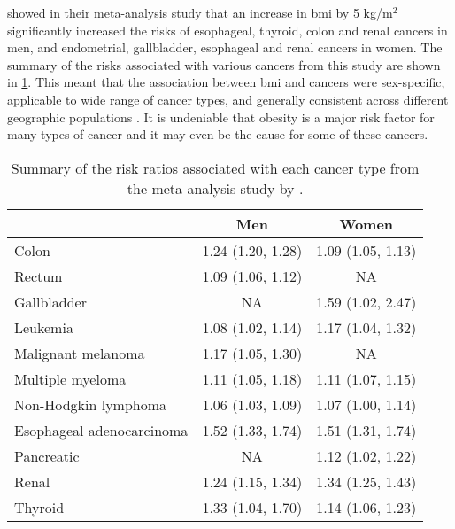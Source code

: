 \citet{Renehan2008} showed in their meta-analysis study  that an increase in \gls{bmi} by 5 kg/m$^2$ significantly increased the risks of esophageal, thyroid, colon and renal cancers in men, and endometrial, gallbladder, esophageal and renal cancers in women.
The summary of the risks associated with various cancers from this study are shown in \cref{tab:renehan_cancer_risks}.
This meant that the association between \gls{bmi} and cancers were sex-specific, applicable to wide range of cancer types, and generally consistent across different geographic populations \citep{Renehan2008,Roberts2010}.
It is undeniable that obesity is a major risk factor for many types of cancer and it may even be the cause for some of these cancers.

\begin{table}[htb]
	\centering
	\begin{threeparttable}
		\caption[Summary of the risk ratios associated with each cancer type from the meta-analysis study by \citet{Renehan2008}]{Summary of the risk ratios associated with each cancer type from the meta-analysis study by \citet{Renehan2008}.}
		\label{tab:renehan_cancer_risks}
		\begin{tabular}{lcc}
													   & Men               & Women\\
			\hline
			\rule{0pt}{2.25ex}Colon                 & 1.24 (1.20, 1.28) & 1.09 (1.05, 1.13)\\
			Rectum                                  & 1.09 (1.06, 1.12) & NA\tnote{3}\\
			Gallbladder                             & NA                & 1.59 (1.02, 2.47)\\
			Leukemia                                & 1.08 (1.02, 1.14) & 1.17 (1.04, 1.32)\\
			Malignant melanoma                      & 1.17 (1.05, 1.30) & NA\\
			Multiple myeloma                        & 1.11 (1.05, 1.18) & 1.11 (1.07, 1.15)\\
			Non-Hodgkin lymphoma                    & 1.06 (1.03, 1.09) & 1.07 (1.00, 1.14)\\
			Esophageal adenocarcinoma               & 1.52 (1.33, 1.74) & 1.51 (1.31, 1.74)\\
			Pancreatic                              & NA                & 1.12 (1.02, 1.22)\\
			Renal                                   & 1.24 (1.15, 1.34) & 1.34 (1.25, 1.43)\\
			Thyroid                                 & 1.33 (1.04, 1.70) & 1.14 (1.06, 1.23)\\

\end{tabular}
\end{threeparttable}
\end{table}
